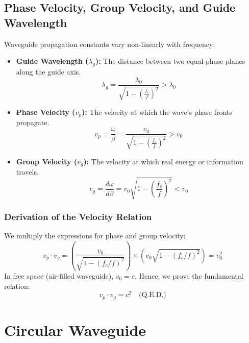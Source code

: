 \documentclass[12pt,a4paper]{article}
\begin{document}
\subsection{Phase Velocity, Group Velocity, and Guide Wavelength}
Waveguide propagation constants vary non-linearly with frequency:
\begin{itemize}[leftmargin=*, itemsep=3pt]
  \item \textbf{Guide Wavelength ($\lambda_g$):} The distance between two equal-phase planes along the guide axis.
    \begin{equation}
      \lambda_g = \frac{\lambda_0}{\sqrt{1 - \left(\frac{f_c}{f}\right)^{\!2}}} > \lambda_0
    \end{equation}
  \item \textbf{Phase Velocity ($v_p$):} The velocity at which the wave's phase fronts propagate.
    \begin{equation}
      v_p = \frac{\omega}{\beta} = \frac{v_0}{\sqrt{1 - \left(\frac{f_c}{f}\right)^{\!2}}} > v_0
    \end{equation}
  \item \textbf{Group Velocity ($v_g$):} The velocity at which real energy or information travels.
    \begin{equation}
      v_g = \frac{d\omega}{d\beta} = v_0 \sqrt{1 - \left(\frac{f_c}{f}\right)^{\!2}} < v_0
    \end{equation}
\end{itemize}

\subsubsection{Derivation of the Velocity Relation}
We multiply the expressions for phase and group velocity:
\begin{equation*}
  v_p \cdot v_g = \left( \frac{v_0}{\sqrt{1 - (f_c/f)^2}} \right) \times \left( v_0 \sqrt{1 - (f_c/f)^2} \right) = v_0^2
\end{equation*}
In free space (air-filled waveguide), $v_0 = c$. Hence, we prove the fundamental relation:
\begin{equation}
  v_p \cdot v_g = c^2 \quad \text{(Q.E.D.)}
\end{equation}

\section{Circular Waveguide}
\end{document}
